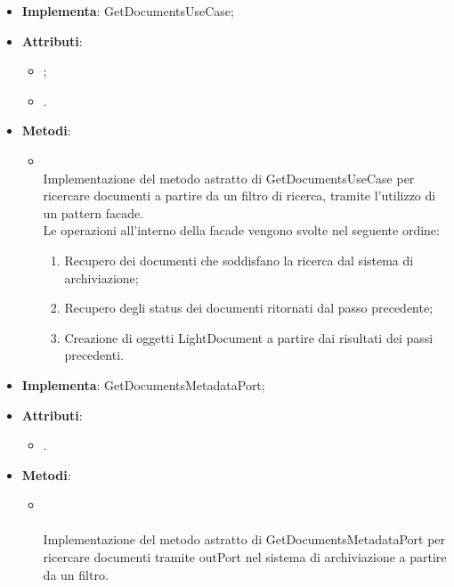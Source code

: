 \documentclass[10pt, a4paper]{article}
\begin{document}
\label{GetDocumentsFacadeServiceDettaglio}
\begin{itemize}
    \item \textbf{Implementa}: GetDocumentsUseCase;
    \item \textbf{Attributi}:
    \begin{itemize}
        \item {};
        \item {}.
    \end{itemize}
    \item \textbf{Metodi}:
    \begin{itemize}
        \item {}\\
        Implementazione del metodo astratto di GetDocumentsUseCase per ricercare documenti a partire da un filtro di ricerca, tramite l'utilizzo di un pattern facade.\\
        Le operazioni all'interno della facade vengono svolte nel seguente ordine:
        \begin{enumerate}
            \item Recupero dei documenti che soddisfano la ricerca dal sistema di archiviazione;
            \item Recupero degli status dei documenti ritornati dal passo precedente;
            \item Creazione di oggetti LightDocument a partire dai risultati dei passi precedenti.
        \end{enumerate}
    \end{itemize}
\end{itemize}

\label{GetDocumentsListAWSS3Dettaglio}
\begin{itemize}
    \item \textbf{Implementa}: GetDocumentsMetadataPort;
    \item \textbf{Attributi}:
    \begin{itemize}
        \item {}.
    \end{itemize}
    \item \textbf{Metodi}:
    \begin{itemize}
        \item {}\\ \\
        Implementazione del metodo astratto di GetDocumentsMetadataPort per ricercare documenti tramite outPort nel sistema di archiviazione a partire da un filtro.
        
    \end{itemize}
\end{itemize}
\end{document}
